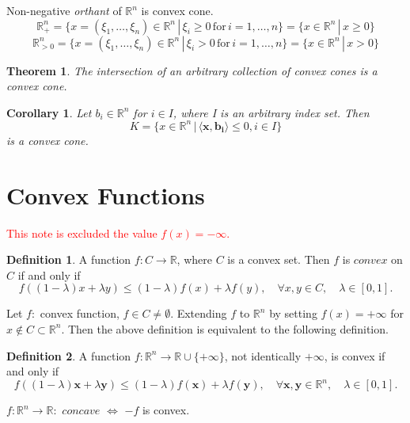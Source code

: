 \documentclass{jsarticle}
\newtheorem{thm}{Theorem}[section]
\newtheorem{cor}{Corollary} [thm]
\theoremstyle{definition}
\newtheorem{dfn}{Definition}[section]
\begin{document}
Non-negative \textit{orthant}  of $\mathbb{R}^n$ is convex cone.
\[
\mathbb{R}^n_{+} = \{x = (\xi_1,  \dots, \xi_n) \in \mathbb{R}^n \, | \, \xi_i \ge 0 \, \text{for}\,  i = 1,  \dots,  n\} = \{x \in \mathbb{R}^n \, | \, x \ge 0\}
\]
\[
\mathbb{R}^n_{> 0} = \{x = (\xi_1,  \dots, \xi_n) \in \mathbb{R}^n \, | \, \xi_i > 0 \, \text{for}\,  i = 1,  \dots,  n\} = \{x \in \mathbb{R}^n \, | \, x > 0\}
\]


\begin{thm}
The intersection of an arbitrary collection of convex cones is a convex cone.
\end{thm}

\begin{cor}
Let  $b_i \in \mathbb{R}^n$ for $i \in I$, where I is an arbitrary index set.  Then
\[
K = \{x \in \mathbb{R}^n \, | \, \langle \bm{x}, \bm{b_i} \rangle \le 0, i \in I \}
\]
is a convex cone.

\end{cor}




\section{Convex Functions}

\textcolor{red}{This note is excluded the value $f(x) = - \infty$.}

\begin{dfn}
A function $f:C \to \mathbb{R}$,  where $C$ is a convex set.  Then $f$ is $convex$ on $C$ if and only if
\[
f((1 - \lambda)x + \lambda y) \le (1 - \lambda) f(x) + \lambda f(y), \quad \forall x, y \in C, \quad \lambda \in [0, 1].
\] 
\end{dfn}

Let
$f:$ convex function,  $f \in C \ne \emptyset$.
Extending $f$ to $\mathbb{R}^n$ by setting $f(x) = +\infty$ for $x \notin C \subset \mathbb{R}^n$.
Then the above definition is equivalent to the following definition.

\begin{dfn}
A function $f:\mathbb{R}^n \to \mathbb{R} \cup \{+ \infty\}$,  not identically $+ \infty$,  is convex if and only if
\[
f((1 - \lambda)\bm{x} + \lambda \bm{y}) \le (1 - \lambda) f(\bm{x}) + \lambda f(\bm{y}), \quad \forall \bm{x}, \bm{y} \in \mathbb{R}^n, \quad \lambda \in [0, 1].
\] 
\end{dfn}


$f: \mathbb{R}^n \to \mathbb{R} :$ $concave$  $\Leftrightarrow$ $- f$ is convex.
\end{document}

